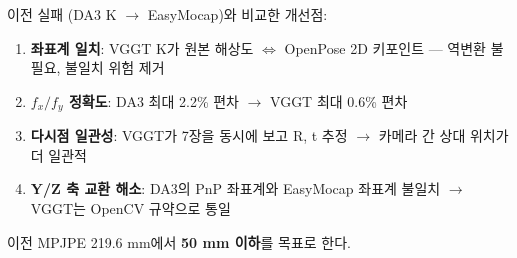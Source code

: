 \documentclass[11pt, a4paper]{report}
\begin{document}
\begin{summary}
이전 실패 (DA3 K $\rightarrow$ EasyMocap)와 비교한 개선점:

\begin{enumerate}[leftmargin=*]
  \item \textbf{좌표계 일치}: VGGT K가 원본 해상도 $\Leftrightarrow$ OpenPose 2D 키포인트 --- 역변환 불필요, 불일치 위험 제거
  \item \textbf{$f_x/f_y$ 정확도}: DA3 최대 2.2\% 편차 $\rightarrow$ VGGT 최대 0.6\% 편차
  \item \textbf{다시점 일관성}: VGGT가 7장을 동시에 보고 R, t 추정 $\rightarrow$ 카메라 간 상대 위치가 더 일관적
  \item \textbf{Y/Z 축 교환 해소}: DA3의 PnP 좌표계와 EasyMocap 좌표계 불일치 $\rightarrow$ VGGT는 OpenCV 규약으로 통일
\end{enumerate}

이전 MPJPE 219.6 mm에서 \textbf{50 mm 이하}를 목표로 한다.
\end{summary}
\end{document}
